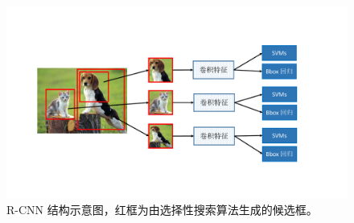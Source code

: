 \begin{figure}[!t]
	\centering
	\includegraphics[trim={3cm, 3.5cm, 5cm, 4cm}, clip, width=\textwidth]{./imgs/RCNN.pdf}
	\caption{R-CNN 结构示意图，红框为由选择性搜索算法生成的候选框。}
	\label{fig:rcnn}
\end{figure}
